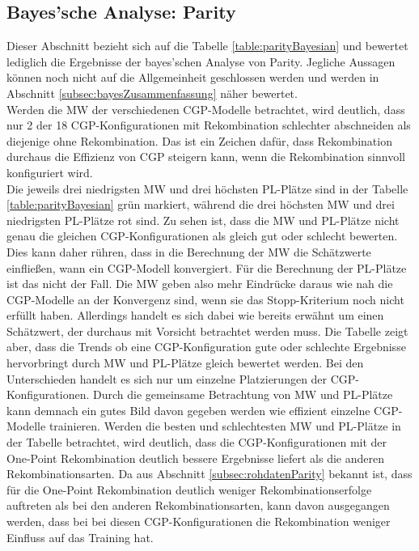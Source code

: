 \subsection{Bayes'sche Analyse: Parity}
\label{subsec:bayesParity}

Dieser Abschnitt bezieht sich auf die Tabelle \ref{table:parityBayesian} und bewertet lediglich die Ergebnisse der bayes'schen Analyse von Parity.
Jegliche Aussagen können noch nicht auf die Allgemeinheit geschlossen werden und werden in Abschnitt \ref{subsec:bayesZusammenfassung} näher bewertet.\\
Werden die MW der verschiedenen CGP-Modelle betrachtet, wird deutlich, dass nur 2 der 18 CGP-Konfigurationen mit Rekombination schlechter abschneiden als diejenige ohne Rekombination.
Das ist ein Zeichen dafür, dass Rekombination durchaus die Effizienz von CGP steigern kann, wenn die Rekombination sinnvoll konfiguriert wird.\\
Die jeweils drei niedrigsten MW und drei höchsten PL-Plätze sind in der Tabelle \ref{table:parityBayesian} grün markiert, während die drei höchsten MW und drei niedrigsten PL-Plätze rot sind.
Zu sehen ist, dass die MW und PL-Plätze nicht genau die gleichen CGP-Konfigurationen als gleich gut oder schlecht bewerten.
Dies kann daher rühren, dass in die Berechnung der MW die Schätzwerte einfließen, wann ein CGP-Modell konvergiert.
Für die Berechnung der PL-Plätze ist das nicht der Fall.
Die MW geben also mehr Eindrücke daraus wie nah die CGP-Modelle an der Konvergenz sind, wenn sie das Stopp-Kriterium noch nicht erfüllt haben.
Allerdings handelt es sich dabei wie bereits erwähnt um einen Schätzwert, der durchaus mit Vorsicht betrachtet werden muss.
Die Tabelle zeigt aber, dass die Trends ob eine CGP-Konfiguration gute oder schlechte Ergebnisse hervorbringt durch MW und PL-Plätze gleich bewertet werden.
Bei den Unterschieden handelt es sich nur um einzelne Platzierungen der CGP-Konfigurationen.
Durch die gemeinsame Betrachtung von MW und PL-Plätze kann demnach ein gutes Bild davon gegeben werden wie effizient einzelne CGP-Modelle trainieren.
Werden die besten und schlechtesten MW und PL-Plätze in der Tabelle betrachtet, wird deutlich, dass die CGP-Konfigurationen mit der One-Point Rekombination deutlich bessere Ergebnisse liefert als die anderen Rekombinationsarten.
Da aus Abschnitt \ref{subsec:rohdatenParity} bekannt ist, dass für die One-Point Rekombination deutlich weniger Rekombinationserfolge auftreten als bei den anderen Rekombinationsarten, kann davon ausgegangen werden, dass bei bei diesen CGP-Konfigurationen die Rekombination weniger Einfluss auf das Training hat.
